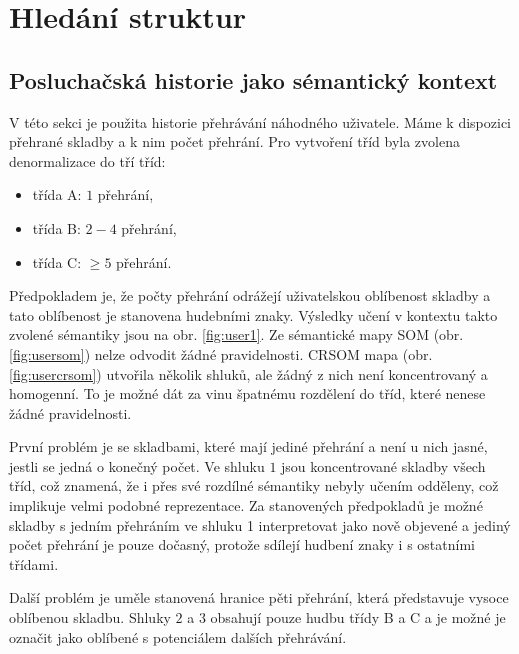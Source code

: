 \documentclass[thesis=M,czech]{FITthesis}[2012/06/26]
\begin{document}
\section{Hledání struktur}


\subsection{Posluchačská historie jako sémantický kontext}
V této sekci je použita historie přehrávání náhodného uživatele. Máme k dispozici přehrané skladby a k nim počet přehrání. Pro vytvoření tříd byla zvolena denormalizace do tří tříd:

\begin{itemize}
\item třída A: $1$ přehrání,
\item třída B: $2-4$ přehrání,
\item třída C: $\geq5$ přehrání.
\end{itemize}

Předpokladem je, že počty přehrání odrážejí uživatelskou oblíbenost skladby a tato oblíbenost je stanovena hudebními znaky. Výsledky učení v kontextu takto zvolené sémantiky jsou na obr. \ref{fig:user1}. Ze sémantické mapy SOM (obr. \ref{fig:usersom}) nelze odvodit žádné pravidelnosti. CRSOM mapa (obr. \ref{fig:usercrsom}) utvořila několik shluků, ale žádný z nich není koncentrovaný a homogenní. To je možné dát za vinu špatnému rozdělení do tříd, které nenese žádné pravidelnosti.

První problém je se skladbami, které mají jediné přehrání a není u nich jasné, jestli se jedná o konečný počet. Ve shluku $1$ jsou koncentrované skladby všech tříd, což znamená, že i přes své rozdílné sémantiky nebyly učením odděleny, což implikuje  velmi podobné reprezentace. Za stanovených předpokladů je možné skladby s jedním přehráním ve shluku 1 interpretovat jako nově objevené a jediný počet přehrání je pouze dočasný, protože sdílejí hudbení znaky i s ostatními třídami.

Další problém je uměle stanovená hranice pěti přehrání, která představuje vysoce oblíbenou skladbu. Shluky $2$ a $3$ obsahují pouze hudbu třídy B a C a je možné je označit jako oblíbené s potenciálem dalších přehrávání.
\end{document}
